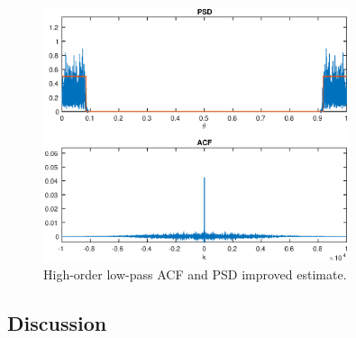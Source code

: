 \begin{figure}[h]
\centering
\includegraphics[width=0.8\textwidth]{bilder/Lab1/Lab1fig10.eps}
\caption{High-order low-pass ACF and PSD improved estimate.}
\label{fig:Lab1fig10}
\end{figure}


\subsection{Discussion}
